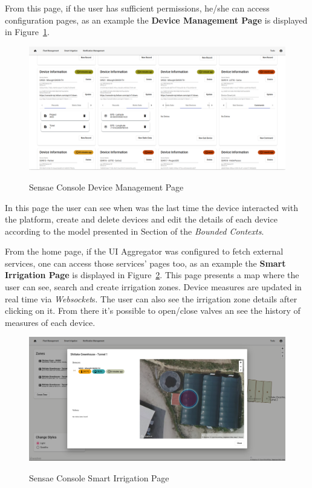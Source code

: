 From this page, if the user has sufficient permissions, he/she can access configuration pages, as an example the \textbf{Device Management Page} is displayed in Figure~\ref{fig:implementation:description:ui:device}.

\begin{figure}[H]
    \centering
    \resizebox{\columnwidth}{!}
    {
       \includegraphics{assets/figures/ui/device-management.png}
    }
    \caption[Sensae Console Device Management Page]{Sensae Console Device Management Page}
    \label{fig:implementation:description:ui:device}
\end{figure}

In this page the user can see when was the last time the device interacted with the platform, create and delete devices and edit the details of each device according to the model presented in Section of the \textit{Bounded Contexts}.

From the home page, if the UI Aggregator was configured to fetch external services, one can access those services' pages too, as an example the \textbf{Smart Irrigation Page} is displayed in Figure~\ref{fig:implementation:description:ui:smartirrigation}.
This page presents a map where the user can see, search and create irrigation zones. Device measures are updated in real time via \textit{Websocket}s. The user can also see the irrigation zone details after clicking on it. From there it's possible to open/close valves an see the history of measures of each device.

\begin{figure}[H]
    \centering
    \resizebox{\columnwidth}{!}
    {
       \includegraphics{assets/figures/ui/smart-irrigation.png}
    }
    \caption[Sensae Console Smart Irrigation Page]{Sensae Console Smart Irrigation Page}
    \label{fig:implementation:description:ui:smartirrigation}
\end{figure}


